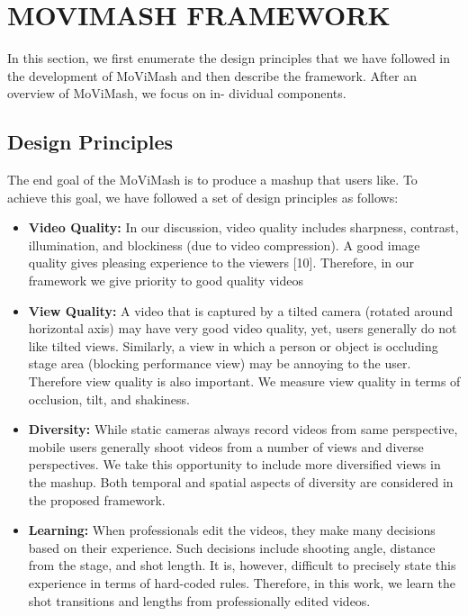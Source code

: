 \documentclass{sig-alternate}
\begin{document}
\section{MOVIMASH FRAMEWORK}
In this section, we first enumerate the design principles that we
have followed in the development of MoViMash and then describe
the framework. After an overview of MoViMash, we focus on in-
dividual components.



\subsection{Design Principles}
The end goal of the MoViMash is to produce a mashup that users
like. To achieve this goal, we have followed a set of design principles as follows:

\begin{itemize}
\item \textbf{Video Quality:} In our discussion, video quality includes
sharpness, contrast, illumination, and blockiness (due to video
compression). A good image quality gives pleasing experience to the viewers [10]. Therefore, in our framework we
give priority to good quality videos

\item \textbf{View Quality:} A video that is captured by a tilted camera
(rotated around horizontal axis) may have very good video
quality, yet, users generally do not like tilted views. Similarly, a view in which a person or object is occluding stage
area (blocking performance view) may be annoying to the
user. Therefore view quality is also important. We measure
view quality in terms of occlusion, tilt, and shakiness.




\item \textbf{Diversity:} While static cameras always record videos from
same perspective, mobile users generally shoot videos from
a number of views and diverse perspectives. We take this
opportunity to include more diversified views in the mashup.
Both temporal and spatial aspects of diversity are considered
in the proposed framework.

\item \textbf{Learning:} When professionals edit the videos, they make
many decisions based on their experience. Such decisions
include shooting angle, distance from the stage, and shot
length. It is, however, difficult to precisely state this experience in terms of hard-coded rules. Therefore, in this work,
we learn the shot transitions and lengths from professionally
edited videos.

\end{itemize}
\end{document}
